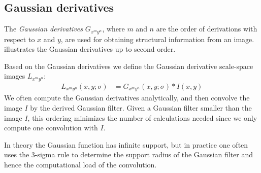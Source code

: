 \documentclass[thesis.tex]{subfiles}
\begin{document}
\subsection{Gaussian derivatives}
\label{sec:gaussianDerivatives}

The \emph{Gaussian derivatives} $G_{x^m y^n}$, where $m$ and $n$ are the order of derivations with respect to $x$ and $y$, are used for obtaining structural information from an image.  illustrates the Gaussian derivatives up to second order.

Based on the Gaussian derivatives we define the Gaussian derivative scale-space images $L_{x^m y^n}$:
\begin{align}
	L_{x^m y^n}(x,y;\sigma) &= G_{x^m y^n}(x,y;\sigma) \ast I(x,y)
\end{align}
%
We often compute the Gaussian derivatives analytically, and then convolve the image $I$ by the derived Gaussian filter. Given a Gaussian filter smaller than the image $I$, this ordering minimizes the number of calculations needed since we only compute one convolution with $I$.

In theory the Gaussian function has infinite support, but in practice one often uses the 3-sigma rule to determine the support radius of the Gaussian filter and hence the computational load of the convolution.
\end{document}
